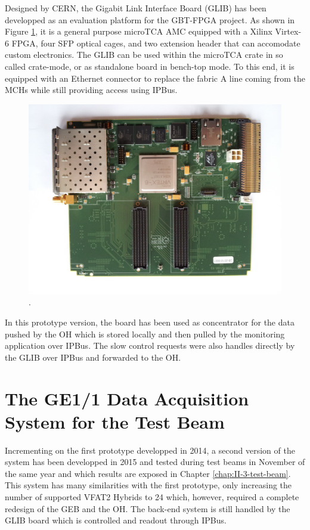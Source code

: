       Designed by CERN, the Gigabit Link Interface Board (GLIB) \cite{Vichoudis:1359270} has been developped as an evaluation platform for the GBT-FPGA project. As shown in Figure \ref{fig:II-2-daq-glib}, it is a general purpose microTCA AMC equipped with a Xilinx Virtex-6 FPGA, four SFP optical cages, and two extension header that can accomodate custom electronics. The GLIB can be used within the microTCA crate in so called crate-mode, or as standalone board in bench-top mode. To this end, it is equipped with an Ethernet connector to replace the fabric A line coming from the MCHs while still providing access using IPBus. \\

      \begin{figure}[h!]
        \centering
        \includegraphics[width=\textwidth]{img/II-2-daq/glib.jpg}
        \caption{\cite{Vichoudis:1359270}.}
        \label{fig:II-2-daq-glib}
      \end{figure}

       In this prototype version, the board has been used as concentrator for the data pushed by the OH which is stored locally and then pulled by the monitoring application over IPBus. The slow control requests were also handles directly by the GLIB over IPBus and forwarded to the OH.

  \section{The GE1/1 Data Acquisition System for the Test Beam}

    Incrementing on the first prototype developped in 2014, a second version of the system has been developped in 2015 and tested during test beams in November of the same year and which results are exposed in Chapter \ref{chap:II-3-test-beam}. This system has many similarities with the first prototype, only increasing the number of supported VFAT2 Hybrids to 24 which, however, required a complete redesign of the GEB and the OH. The back-end system is still handled by the GLIB board which is controlled and readout through IPBus.


